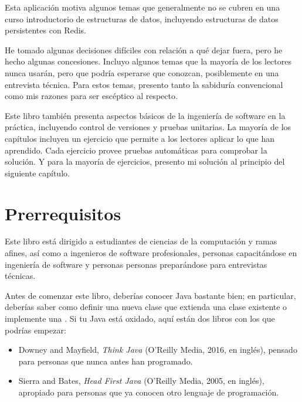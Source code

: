 \documentclass[12pt]{book}
\theoremstyle{exercise}
\begin{document}

Esta aplicación motiva algunos temas que generalmente no se cubren
en una curso introductorio de estructuras de datos, incluyendo estructuras
de datos persistentes con Redis.


He tomado algunas decisiones difíciles con relación a qué dejar fuera,
pero he hecho algunas concesiones. Incluyo algunos temas que la
mayoría de los lectores nunca usarán, pero que podría esperarse
que conozcan, posiblemente en una entrevista técnica. Para estos
temas, presento tanto la sabiduría convencional como mis razones
para ser escéptico al respecto.

Este libro también presenta aspectos básicos de la ingeniería de software
en la práctica, incluyendo control de versiones y pruebas unitarias. La mayoría
de los capítulos incluyen un ejercicio que permite a los lectores aplicar lo
que han aprendido. Cada ejercicio provee pruebas automáticas para comprobar
la solución. Y para la mayoría de ejercicios, presento mi solución al principio
del siguiente capítulo.



\section{Prerrequisitos}
\label{prerequisites}

Este libro está dirigido a estudiantes de ciencias de la computación
y ramas afines, así como a ingenieros de software profesionales,
personas capacitándose en ingeniería de software y personas
personas preparándose para entrevistas técnicas.

Antes de comenzar este libro, deberías conocer Java bastante bien;
en particular, deberías saber como definir una nueva clase que extienda
una clase existente o implemente una . Si tu Java está
oxidado, aquí están dos libros con los que podrías empezar:

\begin{itemize}

\item Downey and Mayfield, {\it Think Java} (O'Reilly Media, 2016, en inglés),
pensado para personas que nunca antes han programado.

\item Sierra and Bates, {\it Head First Java} (O'Reilly Media, 2005, en inglés),
apropiado para personas que ya conocen otro lenguaje de programación.

\end{itemize}
\end{document}
